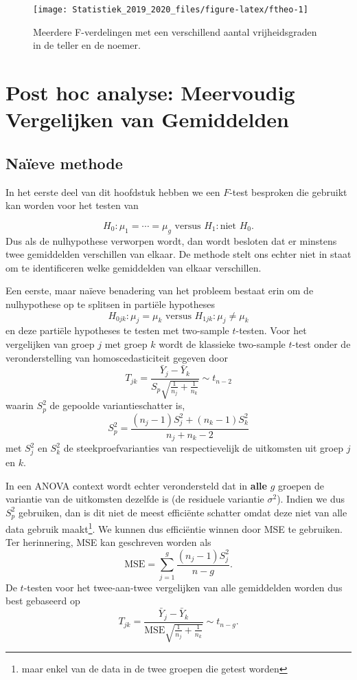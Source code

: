 \documentclass[12pt,dutch,coursenotes]{book}
\let\rmarkdownfootnote\footnote%
\def\footnote{\protect\rmarkdownfootnote}
\theoremstyle{definition}
\theoremstyle{definition}
\theoremstyle{definition}
\theoremstyle{remark}
\begin{document}
\begin{figure}

{\centering \texttt{[image: Statistiek\_2019\_2020\_files/figure-latex/ftheo-1]} 

}

\caption{Meerdere F-verdelingen met een verschillend aantal vrijheidsgraden in de teller en de noemer.}\label{fig:ftheo}
\end{figure}

\section{Post hoc analyse: Meervoudig Vergelijken van
Gemiddelden}\label{post-hoc-analyse-meervoudig-vergelijken-van-gemiddelden}

\subsection{Naïeve methode}\label{naieve-methode}

In het eerste deel van dit hoofdstuk hebben we een \(F\)-test besproken
die gebruikt kan worden voor het testen van

\[  H_0: \mu_1=\cdots = \mu_g \text{ versus } H_1: \text{niet } H_0.\]
Dus als de nulhypothese verworpen wordt, dan wordt besloten dat er
minstens twee gemiddelden verschillen van elkaar. De methode stelt ons
echter niet in staat om te identificeren welke gemiddelden van elkaar
verschillen.

Een eerste, maar naïeve benadering van het probleem bestaat erin om de
nulhypothese op te splitsen in partiële hypotheses
\[H_{0jk}: \mu_j=\mu_k \text{ versus } H_{1jk}: \mu_j \neq \mu_k\] en
deze partiële hypotheses te testen met two-sample \(t\)-testen. Voor het
vergelijken van groep \(j\) met groep \(k\) wordt de klassieke
two-sample \(t\)-test onder de veronderstelling van homoscedasticiteit
gegeven door
\[T_{jk} = \frac{\bar{Y}_j-\bar{Y}_k}{S_p\sqrt{\frac{1}{n_j}+\frac{1}{n_k}}} \sim t_{n-2}\]
waarin \(S_p^2\) de gepoolde variantieschatter is,
\[S_p^2 = \frac{(n_j-1)S_j^2 + (n_k-1)S_k^2}{n_j+n_k-2}\] met \(S_j^2\)
en \(S_k^2\) de steekproefvarianties van respectievelijk de uitkomsten
uit groep \(j\) en \(k\).

In een ANOVA context wordt echter verondersteld dat in \textbf{alle}
\(g\) groepen de variantie van de uitkomsten dezelfde is (de residuele
variantie \(\sigma^2\)). Indien we dus \(S_p^2\) gebruiken, dan is dit
niet de meest efficiënte schatter omdat deze niet van alle data gebruik
maakt\footnote{maar enkel van de data in de twee groepen die getest
  worden}. We kunnen dus efficiëntie winnen door MSE te gebruiken. Ter
herinnering, MSE kan geschreven worden als
\[\text{MSE}= \sum_{j=1}^g \frac{(n_j-1)S_j^2}{n-g}.\] De \(t\)-testen
voor het twee-aan-twee vergelijken van alle gemiddelden worden dus best
gebaseerd op
\[T_{jk} = \frac{\bar{Y}_j-\bar{Y}_k}{\text{MSE}\sqrt{\frac{1}{n_j}+\frac{1}{n_k}}} \sim t_{n-g}.\]
\end{document}
